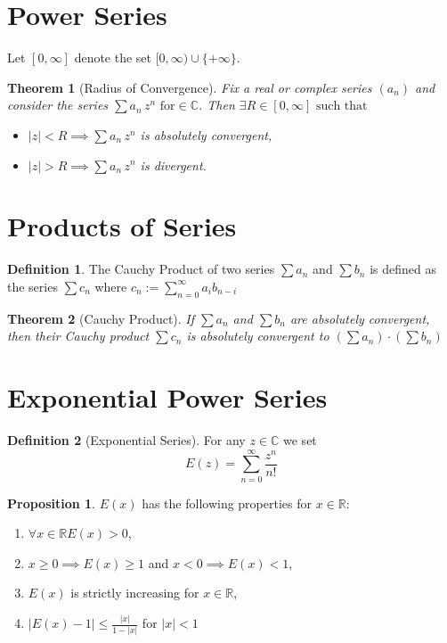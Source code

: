 \documentclass[11pt,a4paper]{article}
\newcommand\R{\mathbb{R}}
\newcommand\st{\text{ such that }}
\newcommand\sumOfSeries{\sum_{n = 0}^{\infty}}
\newtheorem{theorem}{Theorem}
\theoremstyle{definition}
\newtheorem{definition}{Definition}
\newtheorem{proposition}{Proposition}
\begin{document}
\section{Power Series} 

Let $ [0, \infty] $ denote the set $ [0, \infty) \cup \{+\infty\} $.

\begin{theorem}[Radius of Convergence]
   Fix a real or complex series $ (a_n) $ and consider the series $ \sum a_n \, z^n \text{ for} \in \mathbb{C} $. Then $ \exists R \in [0, \infty] \st $
   \begin{itemize}
       \item $ |z| < R \implies \sum a_n \, z^n $ is absolutely convergent, 
       \item $ |z| > R \implies \sum a_n \, z^n $ is divergent.
   \end{itemize}
\end{theorem}

\section{Products of Series}

\begin{definition}
    The Cauchy Product of two series $ \sum a_n $ and $ \sum b_n $ is defined as the series $ \sum c_n $ where $ c_n := \sumOfSeries a_i b_{n - i} $
\end{definition}

\begin{theorem}[Cauchy Product]
    If $ \sum a_n $ and $ \sum b_n $ are absolutely convergent, then their Cauchy product $ \sum c_n $ is absolutely convergent to $ \left(\sum a_n \right) \cdot \left(\sum b_n\right) $
\end{theorem}

\section{Exponential Power Series}

\begin{definition}[Exponential Series]
   For any $ z \in \mathbb{C} $ we set 
   \[ E(z) = \sumOfSeries{\frac{z^n}{n!}} \] 
\end{definition}

\begin{proposition}
    $ E(x) $ has the following properties for $ x \in \R $:
    \begin{enumerate}
        \item $ \forall x \in \R E(x) > 0 $,
        \item $ x \geq 0 \implies E(x) \geq 1 $ and $ x < 0 \implies E(x) < 1 $,
        \item $ E(x) $ is strictly increasing for $ x \in \R $, 
        \item $ |E(x) - 1| \leq \frac{|x|}{1 - |x|} $ for $ |x| < 1 $
    \end{enumerate}
\end{proposition}
\end{document}
